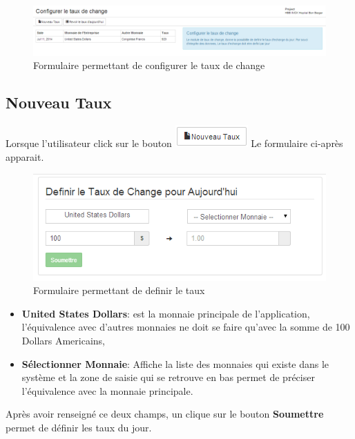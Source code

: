 \documentclass[12pt,a4paper]{report}
\begin{document}
\begin{figure}[h]
\begin{center}
\includegraphics[width=16cm]{pic/FormulaireConfigRate.png}
\end{center}
\caption{Formulaire permettant de configurer le taux de change}
\label{Formulaire permettant de configurer le taux de change}
\end{figure}

\subsection{Nouveau Taux}
Lorsque l'utilisateur click sur le bouton \includegraphics[scale=0.7]{pic/NouveauTaux.png}
 Le formulaire ci-après apparait.

\begin{figure}[h]
\begin{center}
\includegraphics[width=12cm]{pic/DefinirTaux.png}
\end{center}
\caption{Formulaire permettant de definir le taux}
\label{Formulaire permettant de definir le taux}
\end{figure}
\begin{itemize}
\item \textbf{United States Dollars}: est la monnaie principale de l'application, l'équivalence avec d'autres monnaies ne doit se faire qu'avec la somme de 100 Dollars Americains,
\item \textbf{Sélectionner Monnaie}: Affiche la liste des monnaies qui existe dans le système et la zone de saisie qui se retrouve en bas permet de préciser l'équivalence avec la monnaie principale.
\end{itemize}
Après avoir renseigné ce deux champs, un clique sur le bouton \textbf{Soumettre} permet de définir les taux du jour.
\end{document}
